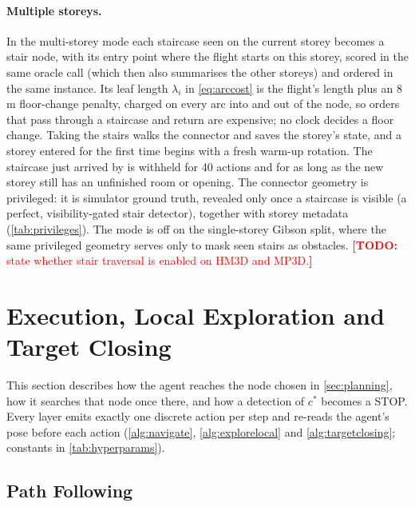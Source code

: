 \documentclass[10pt]{article}
\newcommand{\TODO}[1]{\textcolor{red}{\textbf{[TODO:} #1\textbf{]}}}
\newcommand{\cstar}{c^{*}}
\begin{document}
\paragraph{Multiple storeys.} In the multi-storey mode each staircase seen on the current storey becomes a stair node, with its entry point where the flight starts on this storey, scored in the same oracle call (which then also summarises the other storeys) and ordered in the same instance. Its leaf length $\lambda_i$ in \cref{eq:arccost} is the flight's length plus an 8\,m floor-change penalty, charged on every arc into and out of the node, so orders that pass through a staircase and return are expensive; no clock decides a floor change. Taking the stairs walks the connector and saves the storey's state, and a storey entered for the first time begins with a fresh warm-up rotation. The staircase just arrived by is withheld for 40 actions and for as long as the new storey still has an unfinished room or opening. The connector geometry is privileged: it is simulator ground truth, revealed only once a staircase is visible (a perfect, visibility-gated stair detector), together with storey metadata (\cref{tab:privileges}). The mode is off on the single-storey Gibson split, where the same privileged geometry serves only to mask seen stairs as obstacles. \TODO{state whether stair traversal is enabled on HM3D and MP3D.}

\section{Execution, Local Exploration and Target Closing}
\label{sec:execution}

This section describes how the agent reaches the node chosen in \cref{sec:planning}, how it searches that node once
there, and how a detection of $\cstar$ becomes a STOP. Every layer emits exactly one discrete action per step and
re-reads the agent's pose before each action (\cref{alg:navigate}, \cref{alg:explorelocal} and
\cref{alg:targetclosing}; constants in \cref{tab:hyperparams}).

\subsection{Path Following}
\label{sec:execution-navigate}
\end{document}
